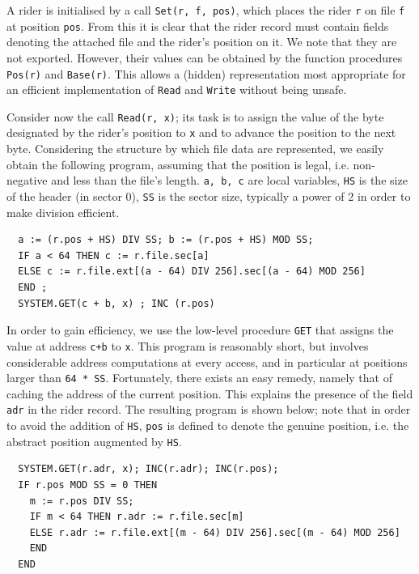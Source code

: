 A rider is initialised by a call \verb|Set(r, f, pos)|, which places the rider \verb|r| on file \verb|f|
at position \verb|pos|. From this it is clear that the rider record must contain fields denoting the
attached file and the rider's position on it. We note that they are not exported. However, their values
can be obtained by the function procedures \verb|Pos(r)| and \verb|Base(r)|. This allows a (hidden)
representation most appropriate for an efficient implementation of \verb|Read| and \verb|Write|
without being unsafe.

Consider now the call \verb|Read(r, x)|; its task is to assign the value of the byte designated by the
rider's position to \verb|x| and to advance the position to the next byte. Considering the structure by
which file data are represented, we easily obtain the following program, assuming that the position is
legal, i.e. non-negative and less than the file's length. \verb|a, b, c| are local variables, \verb|HS|
is the size of the header (in sector 0), \verb|SS| is the sector size, typically a power of 2 in order
to make division efficient.
\begin{verbatim}
  a := (r.pos + HS) DIV SS; b := (r.pos + HS) MOD SS;
  IF a < 64 THEN c := r.file.sec[a]
  ELSE c := r.file.ext[(a - 64) DIV 256].sec[(a - 64) MOD 256]
  END ;
  SYSTEM.GET(c + b, x) ; INC (r.pos)
\end{verbatim}

In order to gain efficiency, we use the low-level procedure \verb|GET| that assigns the value at address
\verb|c+b| to \verb|x|. This program is reasonably short, but involves considerable address computations
at every access, and in particular at positions larger than \verb|64 * SS|. Fortunately, there exists an
easy remedy, namely that of caching the address of the current position. This explains the presence of
the field \verb|adr| in the rider record. The resulting program is shown below; note that in order to
avoid the addition of \verb|HS|, \verb|pos| is defined to denote the genuine position, i.e. the abstract
position augmented by \verb|HS|.
\begin{verbatim}
  SYSTEM.GET(r.adr, x); INC(r.adr); INC(r.pos);
  IF r.pos MOD SS = 0 THEN
    m := r.pos DIV SS;
    IF m < 64 THEN r.adr := r.file.sec[m]
    ELSE r.adr := r.file.ext[(m - 64) DIV 256].sec[(m - 64) MOD 256]
    END
  END
\end{verbatim}

